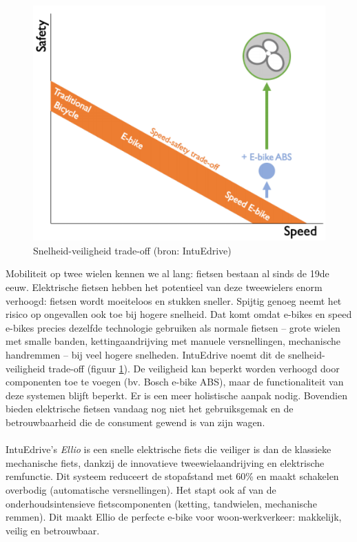 \begin{figure}
  \centering
  \includegraphics[width=1.1\linewidth]{images/snelheid-veiligheid-tradeoff.png}
  \caption{Snelheid-veiligheid trade-off (bron: IntuEdrive)}
  \label{fig:snelheid-veiligheid trade-off}
\end{figure}
\noindent Mobiliteit op twee wielen kennen we al lang: fietsen bestaan al sinds de 19de eeuw. Elektrische fietsen hebben het potentieel van deze tweewielers enorm verhoogd: fietsen wordt moeiteloos en stukken sneller. Spijtig genoeg neemt het risico op ongevallen ook toe bij hogere snelheid. Dat komt omdat e-bikes en speed e-bikes precies dezelfde technologie gebruiken als normale fietsen – grote wielen met smalle banden, kettingaandrijving met manuele versnellingen, mechanische handremmen – bij veel hogere snelheden. IntuEdrive noemt dit de snelheid-veiligheid trade-off (figuur \ref{fig:snelheid-veiligheid trade-off}). De veiligheid kan beperkt worden verhoogd door componenten toe te voegen (bv. Bosch e-bike ABS), maar de functionaliteit van deze systemen blijft beperkt. Er is een meer holistische aanpak nodig. Bovendien bieden elektrische fietsen vandaag nog niet het gebruiksgemak en de betrouwbaarheid die de consument gewend is van zijn wagen.
\\\\
IntuEdrive’s \textit{Ellio} is een snelle elektrische fiets die veiliger is dan de klassieke mechanische fiets, dankzij de innovatieve tweewielaandrijving en elektrische remfunctie. Dit systeem reduceert de stopafstand met 60\% en maakt schakelen overbodig (automatische versnellingen). Het stapt ook af van de onderhoudsintensieve fietscomponenten (ketting, tandwielen, mechanische remmen). Dit maakt Ellio de perfecte e-bike voor woon-werkverkeer: makkelijk, veilig en betrouwbaar.
